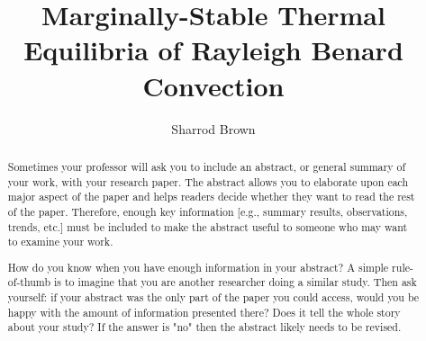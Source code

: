 \documentclass[reprint,amsmath,amssymb,aps]{revtex4-1}
\begin{document}
\title{Marginally-Stable Thermal Equilibria of Rayleigh Benard Convection}

\author{Sharrod Brown}




\begin{abstract}

Sometimes your professor will ask you to include an abstract, or general summary of your work, with your research paper. The abstract allows you to elaborate upon each major aspect of the paper and helps readers decide whether they want to read the rest of the paper. Therefore, enough key information [e.g., summary results, observations, trends, etc.] must be included to make the abstract useful to someone who may want to examine your work.

How do you know when you have enough information in your abstract? A simple rule-of-thumb is to imagine that you are another researcher doing a similar study. Then ask yourself: if your abstract was the only part of the paper you could access, would you be happy with the amount of information presented there? Does it tell the whole story about your study? If the answer is "no" then the abstract likely needs to be revised.

\end{abstract}
\end{document}
